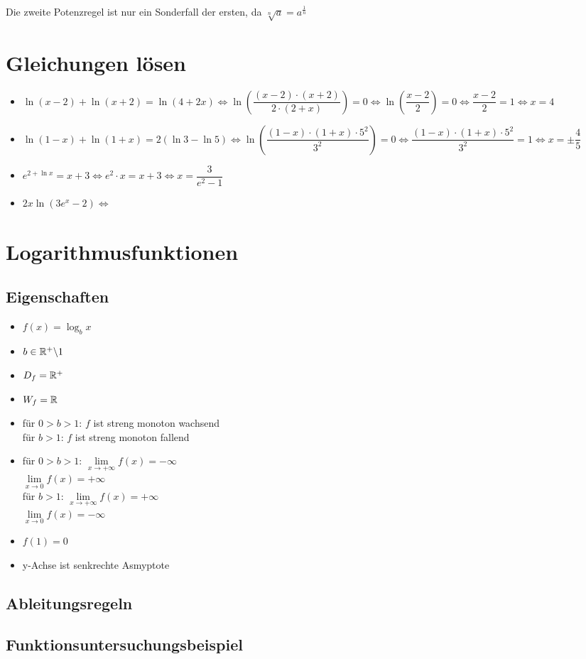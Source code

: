 \documentclass[main.tex]{subfiles}
\begin{document}
\begin{Bemerkung}
Die zweite Potenzregel ist nur ein Sonderfall der ersten, da $\sqrt[n]{a}=a^{\frac{1}{n}}$
\end{Bemerkung}

		\section{Gleichungen lösen}


\begin{Beispiel}
\begin{itemize}
\item $\ln(x-2)+\ln(x+2)=\ln(4+2x)\Leftrightarrow \ln\left(\dfrac{(x-2)\cdot (x+2)}{2\cdot (2+x)}\right)=0\Leftrightarrow \ln \left(\dfrac{x-2}{2}\right)=0\Leftrightarrow \dfrac{x-2}{2}=1\Leftrightarrow x=4$
\item $\ln (1-x) + \ln (1+x)=2(\ln3-\ln5)\Leftrightarrow \ln \left(\dfrac{(1-x)\cdot (1+x)\cdot 5^2 }{ 3^2}\right)=0\Leftrightarrow \dfrac{(1-x)\cdot (1+x)\cdot 5^2 }{ 3^2}=1\Leftrightarrow x=\pm  \dfrac{4}{5} $
\item$ e^{2+\ln x}=x+3\Leftrightarrow e^2 \cdot x=x+3\Leftrightarrow x=\dfrac{3}{e^2-1}$
\item $2x\ln (3e^x-2)\Leftrightarrow$
\end{itemize}
\end{Beispiel}


		\section{Logarithmusfunktionen}


	\subsection{Eigenschaften}

\begin{itemize}
\item$f(x)=\log_bx$
\item$b\in\mathbb{R}^+\backslash 1$
\item$D_f=\mathbb{R}^+$
\item$W_f=\mathbb{R}$
\item für $0>b>1$: $f$ ist streng monoton wachsend\\
für $b>1$: $f$ ist streng monoton fallend
\item für $0>b>1$: $\lim\limits_{x\to +\infty}f(x)=-\infty$\\
			$\lim\limits_{x\to 0}f(x)=+\infty$\\
für $b>1$: $\lim\limits_{x\to +\infty}f(x)=+\infty$\\
	        $\lim\limits_{x\to 0}f(x)=-\infty$
\item $f(1)=0$
\item y-Achse ist senkrechte Asmyptote
\end{itemize}


	\subsection{Ableitungsregeln}
	\subsection{Funktionsuntersuchungsbeispiel}
\end{document}

